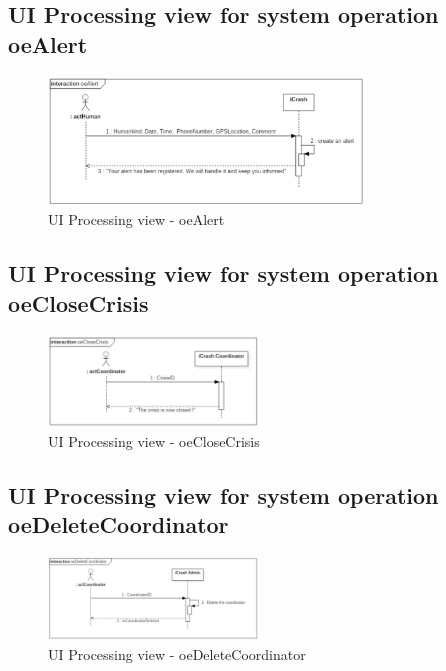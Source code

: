 \subsection{UI Processing view for system operation oeAlert}

\begin{figure}[h]
	\centering	
	\captionsetup{justification=centering}
	\includegraphics[width=0.75\textwidth]{./images/ui_oeAlert.eps}
	\caption{UI Processing view - oeAlert}
\end{figure}


\subsection{UI Processing view for system operation oeCloseCrisis}

\begin{figure}[h]
	\centering	
	\captionsetup{justification=centering}
	\includegraphics[width=0.5\textwidth]{./images/ui_oeCloseCrisis.eps}
	\caption{UI Processing view - oeCloseCrisis}
\end{figure}


\subsection{UI Processing view for system operation oeDeleteCoordinator}

\begin{figure}[h]
	\centering	
	\captionsetup{justification=centering}
	\includegraphics[width=0.5\textwidth]{./images/ui_oeDeleteCoordinator.eps}
	\caption{UI Processing view - oeDeleteCoordinator}
\end{figure}


